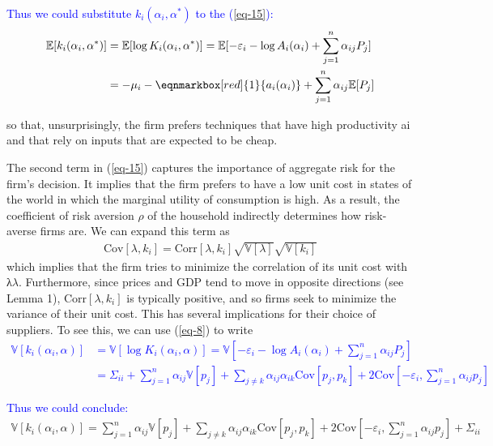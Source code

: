 \documentclass[11pt]{article}
\theoremstyle{definition}
\begin{document}
	\textcolor{blue}{Thus we could substitute $k_i(\alpha_i,\alpha^*)$ to the (\ref{eq-15}):}
	\textcolor{blue}{\begin{align*}
		 \mathbb{E}[k_i(\alpha_i,\alpha^*)] &= \mathbb{E}[\log K_i(\alpha_i,\alpha^*)] = \mathbb{E}[-\varepsilon_i - \log A_i(\alpha_i) + \sum\limits_{j=1}^n \alpha_{ij} P_j] \\
		& = -\mu_i - \eqnmarkbox[red]{1}{a_i(\alpha_i)} +  \sum\limits_{j=1}^n \alpha_{ij} \mathbb{E}[P_j] 
	\end{align*}}
	
	so that, unsurprisingly, the firm prefers techniques that have high productivity ai and that rely on inputs that are expected to be cheap.
	
	The second term in (\ref{eq-15}) captures the importance of aggregate risk for the firm’s decision. It implies that the firm prefers to have a low unit cost in states of the world in which the marginal utility of consumption is high. As a result, the coefficient of risk aversion $\rho$ of the household indirectly determines how risk-averse firms are. We can expand this term as
	\begin{align*}
		\text{Cov}[\lambda,k_i] = \text{Corr}[\lambda, k_i]\sqrt{\mathbb{V}[\lambda]}\sqrt{\mathbb{V}[k_i]}
	\end{align*}
	which implies that the firm tries to minimize the correlation of its unit cost with λ$\lambda$. Furthermore, since prices and GDP tend to move in opposite directions (see Lemma 1), $\text{Corr}[\lambda, k_i]$ is typically positive, and so firms seek to minimize the variance of their unit cost. This has several implications for their choice of suppliers. To see this, we can use (\ref{eq-8}) to write
	\textcolor{blue}{\begin{align*}
		\mathbb{V}[k_i(\alpha_i,\alpha)] &= \mathbb{V}[\log K_i(\alpha_i,\alpha)] = \mathbb{V}[-\varepsilon_i - \log A_i(\alpha_i) + \sum\limits_{j=1}^n \alpha_{ij} P_j] \\
		& = \Sigma_{ii} + \sum\limits_{j=1}^n \alpha_{ij} \mathbb{V}[p_j] + \sum\limits_{j\neq k} \alpha_{ij}\alpha_{ik} \text{Cov}[p_j,p_k] + 2\text{Cov}\left[-\varepsilon_i,\sum\limits_{j=1}^n \alpha_{ij}p_j \right] 
	\end{align*}}
	
	\textcolor{blue}{Thus we could conclude:}
	\begin{align}
		\mathbb{V}[k_i(\alpha_i,\alpha)] = \sum\limits_{j=1}^n \alpha_{ij} \mathbb{V}[p_j] + \sum\limits_{j\neq k} \alpha_{ij}\alpha_{ik} \text{Cov}[p_j,p_k] + 2\text{Cov}\left[-\varepsilon_i,\sum\limits_{j=1}^n \alpha_{ij}p_j \right]  +  \Sigma_{ii} \label{eq-16}
	\end{align}
	
\end{document}
